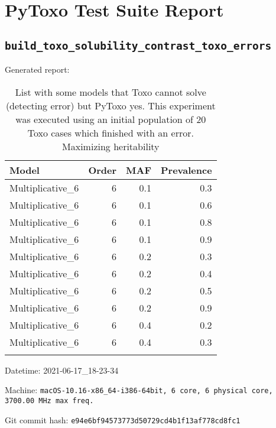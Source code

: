 \documentclass{article}
\begin{document}
\section*{PyToxo Test Suite Report}
\subsection*{\texttt{build\_toxo\_solubility\_contrast\_toxo\_errors}}
Generated report:

\begin{longtable}[H]{lrrr}
\hline
 Model            &   Order &   MAF &   Prevalence \\
\hline
 Multiplicative\_6 &       6 &   0.1 &          0.3 \\
 Multiplicative\_6 &       6 &   0.1 &          0.6 \\
 Multiplicative\_6 &       6 &   0.1 &          0.8 \\
 Multiplicative\_6 &       6 &   0.1 &          0.9 \\
 Multiplicative\_6 &       6 &   0.2 &          0.3 \\
 Multiplicative\_6 &       6 &   0.2 &          0.4 \\
 Multiplicative\_6 &       6 &   0.2 &          0.5 \\
 Multiplicative\_6 &       6 &   0.2 &          0.9 \\
 Multiplicative\_6 &       6 &   0.4 &          0.2 \\
 Multiplicative\_6 &       6 &   0.4 &          0.3 \\
\hline

\caption{List with some models that Toxo cannot solve (detecting error) but PyToxo yes. This experiment was executed using an initial population of 20 Toxo cases which finished with an error. Maximizing heritability}
\end{longtable}
Datetime: 2021-06-17\_18-23-34

Machine: \texttt{macOS-10.16-x86\_64-i386-64bit, 6 core, 6 physical core, 3700.00 MHz max freq.}

Git commit hash: \texttt{e94e6bf94573773d50729cd4b1f13af778cd8fc1}
\end{document}
